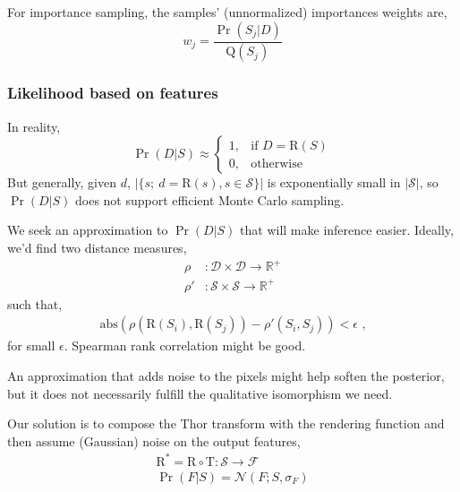 \documentclass[]{report}
\begin{document}
For importance sampling, the samples' (unnormalized) importances
weights are,
\[
w_j = \frac{\Pr(S_j | D)}{\mathrm{Q}(S_j)}
\]

\subsubsection*{Likelihood based on features}
In reality, 
\[
\Pr(D | S) \approx 
\begin{cases}
  1 , & \text{if } D = \mathrm{R}(S) \\
  0 , & \text{otherwise}
\end{cases}
\]
But generally, given $d$, $| \{s;\ d = \mathrm{R}(s), s \in
\mathcal{S} \} |$ is exponentially small in $|\mathcal{S}|$, so $\Pr(D
| S)$ does not support efficient Monte Carlo sampling.

We seek an approximation to $\Pr(D|S)$ that will make inference
easier.  Ideally, we'd find two distance measures,
\begin{align*}
  \rho & : \mathcal{D} \times \mathcal{D} \rightarrow \mathbb{R}^+ \\
  \rho' & : \mathcal{S} \times \mathcal{S} \rightarrow \mathbb{R}^+ 
\end{align*}
such that,
\begin{align*}
  \mathrm{abs} \left( \rho(\mathrm{R}(S_i), \mathrm{R}(S_j)) -
    \rho'(S_i, S_j) \right) < \epsilon \text{ ,}
\end{align*}
for small $\epsilon$.  Spearman rank correlation might be good.

An approximation that adds noise to the pixels might help soften the
posterior, but it does not necessarily fulfill the qualitative
isomorphism we need.

Our solution is to compose the Thor transform with the rendering
function and then assume (Gaussian) noise on the output features,
\begin{align*}
  \mathrm{R}^* = \mathrm{R} \circ \mathrm{T} : \mathcal{S} \rightarrow \mathcal{F}\\
  \Pr(F | S) = \mathcal{N}(F;S, \sigma_F)
\end{align*}
\end{document}
